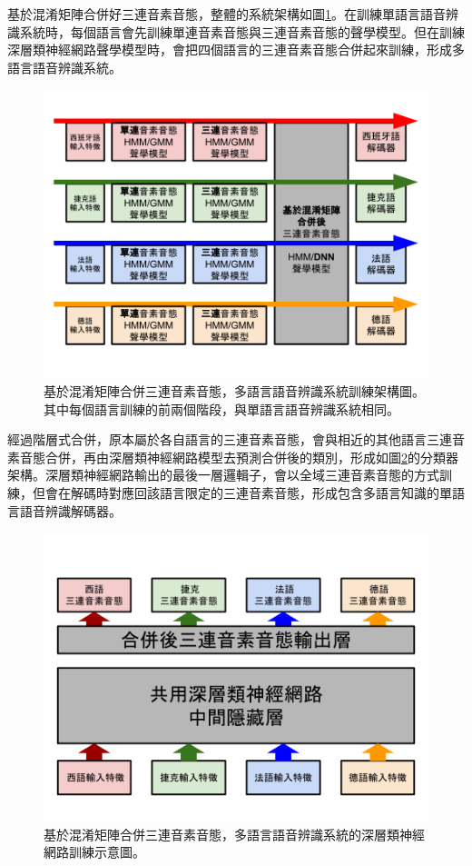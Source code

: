 基於混淆矩陣合併好三連音素音態，整體的系統架構如圖\ref{fig:chap4_CM_framework}。在訓練單語言語音辨識系統時，每個語言會先訓練單連音素音態與三連音素音態的聲學模型。但在訓練深層類神經網路聲學模型時，會把四個語言的三連音素音態合併起來訓練，形成多語言語音辨識系統。
\begin{figure}[!h]
\centering
\includegraphics[scale=0.4]{images/chap4_CM_merged.png}
\caption{基於混淆矩陣合併三連音素音態，多語言語音辨識系統訓練架構圖。其中每個語言訓練的前兩個階段，與單語言語音辨識系統相同。}
\label{fig:chap4_CM_framework}
\end{figure}

經過階層式合併，原本屬於各自語言的三連音素音態，會與相近的其他語言三連音素音態合併，再由深層類神經網路模型去預測合併後的類別，形成如圖\ref{fig:chap4_CM_merged_unit}的分類器架構。深層類神經網路輸出的最後一層邏輯子，會以全域三連音素音態的方式訓練，但會在解碼時對應回該語言限定的三連音素音態，形成包含多語言知識的單語言語音辨識解碼器。
\begin{figure}[!h]
\centering
\includegraphics[scale=0.4]{images/chap4_CM_merged_unit}
\caption{基於混淆矩陣合併三連音素音態，多語言語音辨識系統的深層類神經網路訓練示意圖。}
\label{fig:chap4_CM_merged_unit}
\end{figure}

